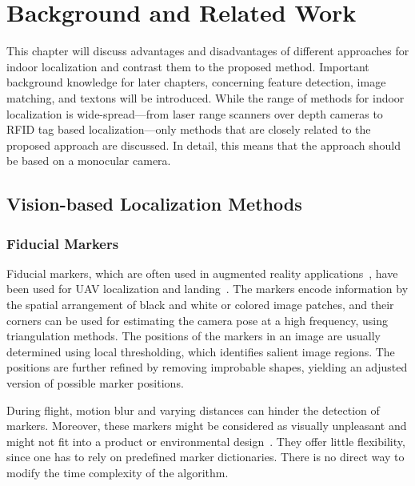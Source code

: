 \chapter{Background and Related Work}
\label{chap:relatedwork}

This chapter will discuss advantages and disadvantages of different approaches for indoor localization and
contrast them to the proposed method. Important
background knowledge for later chapters, concerning feature detection,
image matching, and textons will be introduced. While the range of methods for indoor localization is wide-spread---from laser range scanners over depth cameras to RFID tag based localization---only methods that are closely related to the proposed approach are discussed. In detail, this means that the approach should be based on a monocular camera.

\section{Vision-based Localization Methods}

\subsection{Fiducial Markers}
\label{sec:fiducialmarkers}

Fiducial markers, which are often used in augmented reality
applications~\cite{kato1999marker,garrido2014automatic}, have been
used for UAV localization and
landing~\cite{eberli2011vision,bebop2015}.
The markers encode information by the spatial arrangement of
black and white or colored image patches, and their corners can be
used for estimating the camera pose at a high frequency, using
triangulation methods. The positions of the markers in
an image are usually determined using local thresholding, which identifies salient image
regions. The positions are further refined by removing improbable shapes,
yielding an adjusted version of possible marker positions.

During flight, motion blur and varying distances can hinder the
detection of markers. Moreover, these markers might be considered as
visually unpleasant and might not fit into a product or environmental
design~\cite{chu2013halftone}. They offer little
flexibility, since one has to rely on predefined marker dictionaries.
There is no direct way to modify the time complexity of the algorithm.

